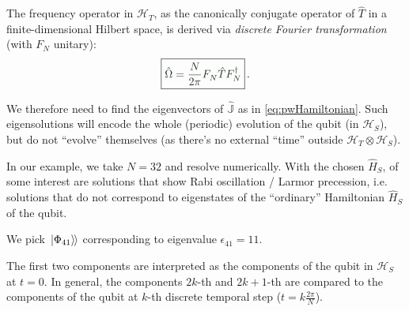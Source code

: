 \documentclass[a0,portrait]{a0poster}
\newcommand{\hilb}[1]{\mathcal{#1}}       %
\newcommand{\ox}{\otimes}
\newcommand{\smallback}{\hspace{-0.115em}}
\newcommand{\dket}[1]{\left.\left| #1 \right\rangle\smallback\right\rangle}
\begin{document}
\begin{multicols}{2}
The frequency operator in $\hilb{H}_T$, as the canonically conjugate operator
of $\hat{T}$ in a finite-dimensional Hilbert space, is derived via
\emph{discrete Fourier transformation} \cite{FiniteHilb} (with $F_N$ unitary):
\begin{equation}
  \boxed{ \color{boxedcolor}
    \hat{\Omega} = \frac{N}{2\pi} F^{}_{N} \hat{T} F^{\dagger}_{N}
  }
  \, \text{.}
\end{equation}

We therefore need to find the eigenvectors of $\hat{\mathbb{J}}$ as in \eqref{eq:pwHamiltonian}.
Such eigensolutions
will encode the whole (periodic) evolution of the qubit (in $\hilb{H}_S$), but do
not ``evolve'' themselves (as there's no external ``time'' outside $\hilb{H}_T \ox \hilb{H}_S$).

In our example, we take $N = 32$ and resolve numerically.
With the chosen $\hat{H}_S$,
of some interest are solutions that show
Rabi oscillation / Larmor precession,
i.e. solutions that do not correspond to eigenstates of
the ``ordinary'' Hamiltonian $\hat{H}_S$ of the qubit.

We pick $\dket{\Phi_{41}}$ corresponding to eigenvalue
$\epsilon_{41} = 11$.

The first two components
are interpreted as the components of the qubit in $\hilb{H}_S$ at $t=0$. 
In general, the components
$2k$\nobreakdash-th and $2k+1$\nobreakdash-th
are compared to the components of the qubit at $k$-th discrete temporal step ($t = k \frac{2\pi}{N}$).


\end{multicols}
\end{document}
